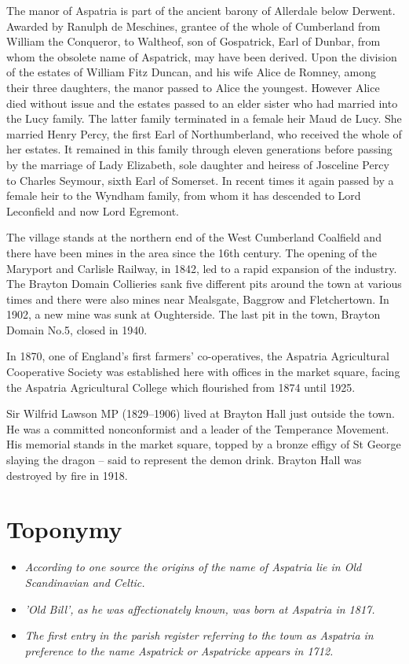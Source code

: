 The manor of Aspatria is part of the ancient barony of Allerdale below
Derwent. Awarded by Ranulph de Meschines, grantee of the whole of
Cumberland from William the Conqueror, to Waltheof, son of Gospatrick,
Earl of Dunbar, from whom the obsolete name of Aspatrick, may have been
derived. Upon the division of the estates of William Fitz Duncan, and
his wife Alice de Romney, among their three daughters, the manor passed
to Alice the youngest. However Alice died without issue and the estates
passed to an elder sister who had married into the Lucy family. The
latter family terminated in a female heir Maud de Lucy. She married
Henry Percy, the first Earl of Northumberland, who received the whole of
her estates. It remained in this family through eleven generations
before passing by the marriage of Lady Elizabeth, sole daughter and
heiress of Josceline Percy to Charles Seymour, sixth Earl of Somerset.
In recent times it again passed by a female heir to the Wyndham family,
from whom it has descended to Lord Leconfield and now Lord Egremont.

The village stands at the northern end of the West Cumberland Coalfield
and there have been mines in the area since the 16th century. The
opening of the Maryport and Carlisle Railway, in 1842, led to a rapid
expansion of the industry. The Brayton Domain Collieries sank five
different pits around the town at various times and there were also
mines near Mealsgate, Baggrow and Fletchertown. In 1902, a new mine was
sunk at Oughterside. The last pit in the town, Brayton Domain No.5,
closed in 1940.

In 1870, one of England's first farmers' co-operatives, the Aspatria
Agricultural Cooperative Society was established here with offices in
the market square, facing the Aspatria Agricultural College which
flourished from 1874 until 1925.

Sir Wilfrid Lawson MP (1829--1906) lived at Brayton Hall just outside
the town. He was a committed nonconformist and a leader of the
Temperance Movement. His memorial stands in the market square, topped by
a bronze effigy of St George slaying the dragon -- said to represent the
demon drink. Brayton Hall was destroyed by fire in 1918.

\section{Toponymy}\label{toponymy}

\begin{itemize}
\item
  \emph{According to one source the origins of the name of Aspatria lie
  in Old Scandinavian and Celtic.}
\item
  \emph{'Old Bill', as he was affectionately known, was born at Aspatria
  in 1817.}
\item
  \emph{The first entry in the parish register referring to the town as
  Aspatria in preference to the name Aspatrick or Aspatricke appears in
  1712.}
\end{itemize}

